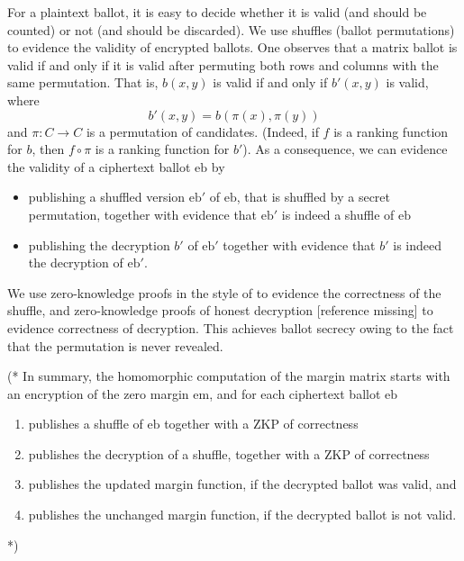 \documentclass{llncs}
\newcommand{\encb}{\mathrm{eb}}
\newcommand{\encm}{\mathrm{em}}
\begin{document}
For a plaintext ballot, it is easy to decide whether it is
valid (and should be counted) or not (and should be discarded). We
use shuffles (ballot permutations) to evidence the validity of
encrypted ballots. One observes that a matrix ballot is valid if and
only if it is valid after permuting both rows and columns with the
same permutation. That is, $b(x,y)$ is valid if and only if $b'(x,y)$
is valid, where
\[ b'(x,y) = b(\pi(x), \pi(y)) \]
and $\pi: C \to C$ is a permutation of candidates. (Indeed, if $f$
is a ranking function for $b$, then $f \circ \pi$ is a ranking
function for $b'$). As a consequence, we can evidence the validity
of a ciphertext ballot $\encb$ by
\begin{itemize}
  \item publishing a shuffled version $\encb'$ of $\encb$, that is
  shuffled by a secret permutation, together with
  evidence that $\encb'$ is indeed a shuffle of $\encb$
  \item publishing the decryption $b'$ of $\encb'$ together with
  evidence that $b'$ is indeed the decryption of $\encb'$.
\end{itemize}

We use zero-knowledge proofs in the style of \cite{DBLP:conf/africacrypt/TereliusW10}
to evidence the correctness of the shuffle, and zero-knowledge
proofs of honest decryption [reference missing] to evidence
correctness of decryption. This achieves ballot secrecy owing to the
fact that the permutation is never revealed.

(* 
In summary, the homomorphic computation of the margin matrix starts
with an encryption of the zero margin $\encm$, and for each
ciphertext ballot $\encb$
\begin{enumerate}
\item publishes a shuffle of $\encb$ together with a ZKP of 
correctness
\item publishes the decryption of a shuffle, together with a ZKP of
correctness
\item publishes the updated margin function, if the decrypted ballot
was valid, and
\item publishes the unchanged margin function, if the decrypted
ballot is not valid.
\end{enumerate} *)
\end{document}
